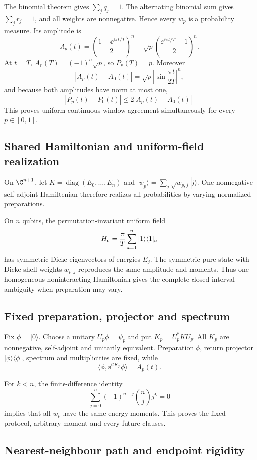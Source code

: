 The binomial theorem gives $\sum_jq_j=1$.  The alternating binomial sum
gives $\sum_jr_j=1$, and all weights are nonnegative.  Hence every $w_p$
is a probability measure.  Its amplitude is
\[
 A_p(t)=\left(\frac{1+\ee^{\ii\pi t/T}}2\right)^n
 +\sqrt p\left(\frac{\ee^{\ii\pi t/T}-1}2\right)^n.
\]
At $t=T$, $A_p(T)=(-1)^n\sqrt p$, so $P_p(T)=p$.  Moreover
\[
 |A_p(t)-A_0(t)|=\sqrt p
 \left|\sin\frac{\pi t}{2T}\right|^n,
\]
and because both amplitudes have norm at most one,
\[
 |P_p(t)-P_0(t)|\le2|A_p(t)-A_0(t)|.
\]
This proves uniform continuous-window agreement simultaneously for every
$p\in[0,1]$.

\subsection{Shared Hamiltonian and uniform-field realization}

On $\C^{n+1}$, let $K=\operatorname{diag}(E_0,\ldots,E_n)$ and
$|\psi_p\rangle=\sum_j\sqrt{w_{p,j}}|j\rangle$.  One nonnegative
self-adjoint Hamiltonian therefore realizes all probabilities by varying
normalized preparations.

On $n$ qubits, the permutation-invariant uniform field
\[
 H_{\rm u}=\frac\pi T\sum_{a=1}^n|1\rangle\langle1|_a
\]
has symmetric Dicke eigenvectors of energies $E_j$.  The symmetric pure
state with Dicke-shell weights $w_{p,j}$ reproduces the same amplitude and
moments.  Thus one homogeneous noninteracting Hamiltonian gives the complete
closed-interval ambiguity when preparation may vary.

\subsection{Fixed preparation, projector and spectrum}

Fix $\phi=|0\rangle$.  Choose a unitary $U_p\phi=\psi_p$ and put
$K_p=U_p^*KU_p$.  All $K_p$ are nonnegative, self-adjoint and unitarily
equivalent.  Preparation $\phi$, return projector
$|\phi\rangle\langle\phi|$, spectrum and multiplicities are fixed, while
\[
 \langle\phi,\ee^{\ii tK_p}\phi\rangle=A_p(t).
\]

For $k<n$, the finite-difference identity
\[
 \sum_{j=0}^n(-1)^{n-j}\binom{n}{j}j^k=0
\]
implies that all $w_p$ have the same energy moments.  This proves the fixed
protocol, arbitrary moment and every-future clauses.

\subsection{Nearest-neighbour path and endpoint rigidity}

